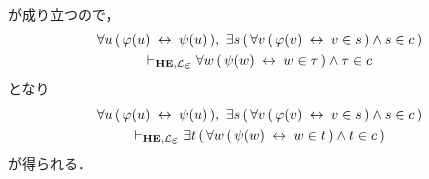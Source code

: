 \begin{metaprf}
\begin{description}
\begin{description}
\begin{align}
						\end{align}
						が成り立つので，
						\begin{align}
							\begin{gathered}
								\forall u\, (\, \varphi(u) \lrarrow \psi(u)\, ),\ 
								\exists s\, (\, \forall v\, (\, \varphi(v) \lrarrow v \in s\, ) \wedge s \in c\, ) \\
								\provable{\mbox{{\bf HE}},\lang{\varepsilon}}
								\forall w\, (\, \psi(w) \lrarrow w \in \tau\, ) \wedge \tau \in c
							\end{gathered}
						\end{align}
						となり
						\begin{align}
							\begin{gathered}
								\forall u\, (\, \varphi(u) \lrarrow \psi(u)\, ),\ 
								\exists s\, (\, \forall v\, (\, \varphi(v) \lrarrow v \in s\, ) \wedge s \in c\, ) \\
								\provable{\mbox{{\bf HE}},\lang{\varepsilon}}
								\exists t\, (\, \forall w\, (\, \psi(w) \lrarrow w \in t\, ) \wedge t \in c\, )
							\end{gathered}
						\end{align}
						が得られる．
						

\end{description}
\end{description}
\end{metaprf}
